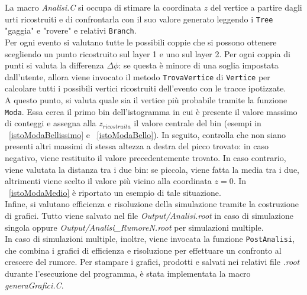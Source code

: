 \documentclass[11pt,a4paper]{article}
\begin{document}
\par La macro \textit{Analisi.C} si occupa di stimare la coordinata $z$ del vertice a partire dagli urti ricostruiti e di confrontarla con il suo valore generato leggendo i \lstinline{Tree} "gaggia" e "rovere" e relativi \lstinline{Branch}. \\
Per ogni evento si valutano tutte le possibili coppie che si possono ottenere scegliendo un punto ricostruito sul layer 1 e uno sul layer 2. Per ogni coppia di punti si valuta la differenza $\Delta\phi$: se questa è minore di una soglia impostata dall'utente, allora viene invocato il metodo \lstinline{TrovaVertice} di \lstinline{Vertice} per calcolare tutti i possibili vertici ricostruiti dell'evento con le tracce ipotizzate.\\
A questo punto, si valuta quale sia il vertice più probabile tramite la funzione \lstinline{Moda}. Essa cerca il primo bin dell'istogramma in cui è presente il valore massimo di conteggi e assegna alla $z_{ricostruita}$ il valore centrale del bin (esempi in \figurename~\ref{istoModaBellissimo} e \figurename~\ref{istoModaBello}). In seguito, controlla che non siano presenti altri massimi di stessa altezza a destra del picco trovato: in caso negativo, viene restituito il valore precedentemente trovato. In caso contrario, viene valutata la distanza tra i due bin: se piccola, viene fatta la media tra i due, altrimenti viene scelto il valore più vicino alla coordinata $z = 0$. In \figurename~\ref{istoModaMedio} è riportato un esempio di tale situazione.\\
Infine, si valutano efficienza e risoluzione della simulazione tramite la costruzione di grafici. Tutto viene salvato nel file \textit{Output/Analisi.root} in caso di simulazione singola oppure \textit{Output/Analisi\_RumoreN.root} per simulazioni multiple.\\
In caso di simulazioni multiple, inoltre, viene invocata la funzione \lstinline{PostAnalisi}, che combina i grafici di efficienza e risoluzione per effettuare un confronto al crescere del rumore.
Per stampare i grafici, prodotti e salvati nei relativi file \textit{.root} durante l'esecuzione del programma, è stata implementata la macro \textit{generaGrafici.C}.
\end{document}
